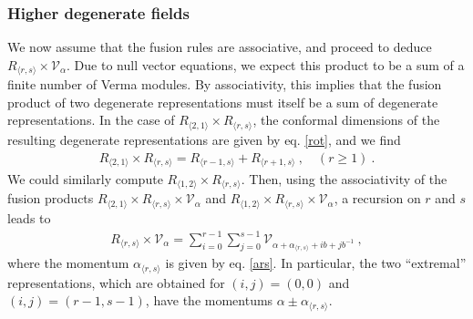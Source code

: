 \documentclass[12pt, a4paper, notitlepage, twoside]{report}
\numberwithin{equation}{section}
\theoremstyle{break}
\begin{document}
\subsubsection{Higher degenerate fields}

We now assume that the fusion rules are associative, and proceed to deduce $R_{\langle r,s \rangle}\times \mathcal{V}_\alpha$.
Due to null vector equations, we expect this product to be a sum of a finite number of Verma modules.
By associativity, this implies that the fusion product of two degenerate representations must itself be a sum of degenerate representations.
In the case of  
$R_{\langle 2,1\rangle}\times R_{\langle r,s\rangle}$, the conformal dimensions of the resulting degenerate representations are given by eq. \eqref{rot}, and we find
\begin{align}
R_{\langle 2,1\rangle}\times R_{\langle r,s\rangle} = R_{\langle r-1,s\rangle} + R_{\langle r+1,s\rangle }\ , \quad (r\geq 1)\ .
\end{align}
We could similarly compute $R_{\langle 1,2\rangle}\times R_{\langle r,s\rangle}$.
Then, using the associativity of the fusion products $R_{\langle 2,1\rangle}\times R_{\langle r,s\rangle}\times \mathcal{V}_\alpha$ and $R_{\langle 1,2\rangle}\times R_{\langle r,s\rangle}\times \mathcal{V}_\alpha$, a recursion on $r$ and $s$ leads to
\begin{align}
 \boxed{R_{\langle r,s \rangle}\times \mathcal{V}_\alpha = \sum_{i=0}^{r-1} \sum_{j=0}^{s-1} \mathcal{V}_{\alpha + \alpha_{\langle r,s \rangle}+ ib+jb^{-1}}}\ ,
\label{rtv}
\end{align}
where the momentum $\alpha_{\langle r,s \rangle}$ is given by eq. \eqref{ars}. 
In particular, the two ``extremal'' representations, which are obtained for $(i,j)=(0,0)$ and $(i,j)=(r-1,s-1)$, have the momentums
$\alpha \pm \alpha_{\langle r,s \rangle} $.
\end{document}
